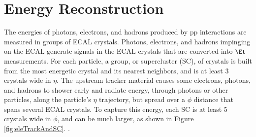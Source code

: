 \section{Energy Reconstruction}
\label{sec:enrgReco}
The energies of photons, electrons, and hadrons produced by pp interactions are measured in groups of ECAL crystals.  Photons, 
electrons, and hadrons impinging on the ECAL generate signals in the ECAL crystals that are converted into $\Et$ measurements.  For 
each particle, a group, or supercluster (SC), of crystals is built from the most energetic crystal and its nearest neighbors, and 
is at least 3 crystals wide in $\eta$.  The upstream tracker material causes some electrons, photons, and hadrons to shower early 
and radiate energy, through photons or other particles, along the particle's $\eta$ trajectory, but spread over a $\phi$ distance 
that spans several ECAL crystals.  To capture this energy, each SC is at least 5 crystals wide in $\phi$, and can be much larger, 
as shown in Figure \ref{fig:eleTrackAndSC}.  .








